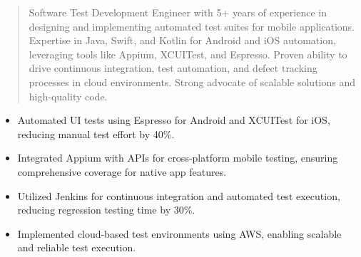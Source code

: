



\makecvheader

\begin{quote}
  \noindent
  Software Test Development Engineer with 5+ years of experience in designing and implementing automated test suites for mobile applications. Expertise in Java, Swift, and Kotlin for Android and iOS automation, leveraging tools like Appium, XCUITest, and Espresso. Proven ability to drive continuous integration, test automation, and defect tracking processes in cloud environments. Strong advocate of scalable solutions and high-quality code.
\end{quote}

\par\smallskip
\noindent
\begin{minipage}{20cm}
  \begin{minipage}{9.75cm}
    \begin{itemize}
      \item Automated UI tests using Espresso for Android and XCUITest for iOS, reducing manual test effort by 40\%.
      \item Integrated Appium with APIs for cross-platform mobile testing, ensuring comprehensive coverage for native app features.
    \end{itemize}
  \end{minipage}
  \hfill
  \begin{minipage}{9.75cm}
    \begin{itemize}
      \item Utilized Jenkins for continuous integration and automated test execution, reducing regression testing time by 30\%.
      \item Implemented cloud-based test environments using AWS, enabling scalable and reliable test execution.
    \end{itemize}
  \end{minipage}
\end{minipage}
\par\smallskip
\divider

